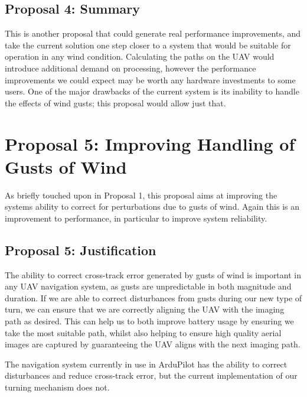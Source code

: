 \subsection{Proposal 4: Summary} 
\label{future:onboardsummary}

This is another proposal that could generate real performance improvements, and take the current solution one step closer to a system that would be suitable for operation in any wind condition. Calculating the paths on the UAV would introduce additional demand on processing, however the performance improvements we could expect may be worth any hardware investments to some users. One of the major drawbacks of the current system is its inability to handle the effects of wind gusts; this proposal would allow just that. 

\section{Proposal 5: Improving Handling of Gusts of Wind} 
\label{future:gusts}

As briefly touched upon in Proposal 1, this proposal aims at improving the systems ability to correct for perturbations due to gusts of wind. Again this is an improvement to performance, in particular to improve system reliability. 

\subsection{Proposal 5: Justification}
\label{future:gustsreason}

The ability to correct cross-track error generated by gusts of wind is important in any UAV navigation system, as gusts are unpredictable in both magnitude and duration. If we are able to correct disturbances from gusts during our new type of turn, we can ensure that we are correctly aligning the UAV with the imaging path as desired. This can help us to both improve battery usage by ensuring we take the most suitable path, whilst also helping to ensure high quality aerial images are captured by guaranteeing the UAV aligns with the next imaging path. 

The navigation system currently in use in ArduPilot has the ability to correct disturbances and reduce cross-track error, but the current implementation of our turning mechanism does not. 

